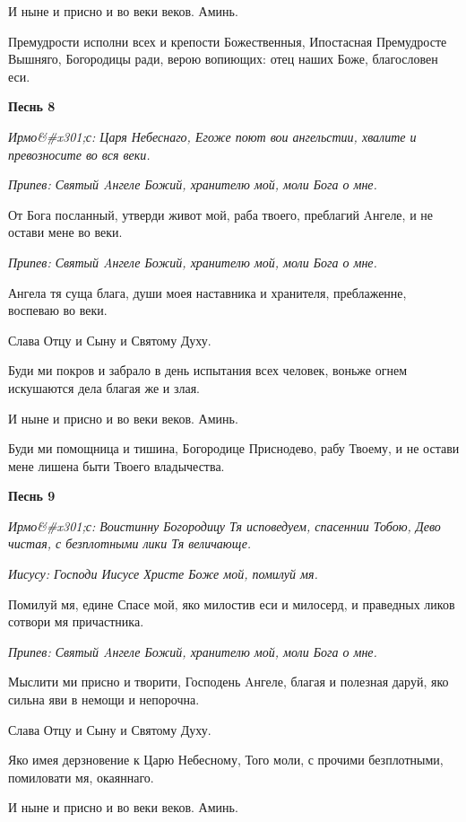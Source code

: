 И ныне и присно и во веки веков. Аминь.


Премудрости исполни всех и крепости Божественныя, Ипостасная Премудросте Вышняго, Богородицы ради, верою вопиющих: отец наших Боже, благословен еси.




\bfseries Песнь 8\normalfont{}


\itshape Ирмо&#x301;с:\normalfont{} Царя Небеснаго, Егоже поют вои ангельстии, хвалите и превозносите во вся веки.


\itshape Припев:\normalfont{} Святый Aнгеле Божий, хранителю мой, моли Бога о мне.


От Бога посланный, утверди живот мой, раба твоего, преблагий Aнгеле, и не остави мене во веки.


\itshape Припев:\normalfont{} Святый Aнгеле Божий, хранителю мой, моли Бога о мне.


Ангела тя суща блага, души моея наставника и хранителя, преблаженне, воспеваю во веки.


Слава Отцу и Сыну и Святому Духу.


Буди ми покров и забрало в день испытания всех человек, воньже огнем искушаются дела благая же и злая.


И ныне и присно и во веки веков. Аминь.


Буди ми помощница и тишина, Богородице Приснодево, рабу Твоему, и не остави мене лишена быти Твоего владычества.




\bfseries Песнь 9\normalfont{}


\itshape Ирмо&#x301;с:\normalfont{} Воистинну Богородицу Тя исповедуем, спасеннии Тобою, Дево чистая, с безплотными лики Тя величающе.


\itshape Иисусу:\normalfont{} Господи Иисусе Христе Боже мой, помилуй мя.


Помилуй мя, едине Спасе мой, яко милостив еси и милосерд, и праведных ликов сотвори мя причастника.


\itshape Припев:\normalfont{} Святый Aнгеле Божий, хранителю мой, моли Бога о мне.


Мыслити ми присно и творити, Господень Aнгеле, благая и полезная даруй, яко сильна яви в немощи и непорочна.


Слава Отцу и Сыну и Святому Духу.


Яко имея дерзновение к Царю Небесному, Того моли, с прочими безплотными, помиловати мя, окаяннаго.


И ныне и присно и во веки веков. Аминь.


